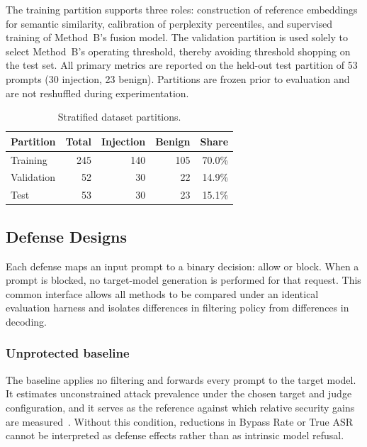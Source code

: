 \documentclass{article}
\begin{document}
The training partition supports three roles: construction of reference embeddings for semantic similarity, calibration of perplexity percentiles, and supervised training of Method~B's fusion model.
The validation partition is used solely to select Method~B's operating threshold, thereby avoiding threshold shopping on the test set.
All primary metrics are reported on the held-out test partition of 53 prompts (30 injection, 23 benign).
Partitions are frozen prior to evaluation and are not reshuffled during experimentation.

\begin{table}[H]
  \centering
  \caption{Stratified dataset partitions.}
  \label{tab:splits}
  \begin{tabular}{lrrrr}
    \hline
    Partition & Total & Injection & Benign & Share \\
    \hline
    Training & 245 & 140 & 105 & 70.0\% \\
    Validation & 52 & 30 & 22 & 14.9\% \\
    Test & 53 & 30 & 23 & 15.1\% \\
    \hline
  \end{tabular}
\end{table}

\subsection{Defense Designs}
\label{sec:defenses}

Each defense maps an input prompt to a binary decision: allow or block.
When a prompt is blocked, no target-model generation is performed for that request.
This common interface allows all methods to be compared under an identical evaluation harness and isolates differences in filtering policy from differences in decoding.

\subsubsection{Unprotected baseline}

The baseline applies no filtering and forwards every prompt to the target model.
It estimates unconstrained attack prevalence under the chosen target and judge configuration, and it serves as the reference against which relative security gains are measured~\cite{zizzo2025adversarial,promptfoo2024owasp}.
Without this condition, reductions in Bypass Rate or True ASR cannot be interpreted as defense effects rather than as intrinsic model refusal.
\end{document}

